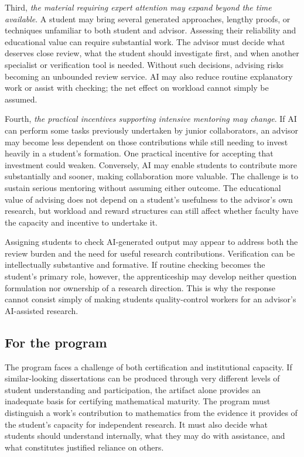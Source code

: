 \documentclass[11pt]{article}
\begin{document}
Third, \emph{the material requiring expert attention may expand beyond the time available}.
A student may bring several generated approaches, lengthy proofs, or techniques unfamiliar
to both student and advisor. Assessing their reliability and educational value can require
substantial work. The advisor must decide what deserves close review, what the student
should investigate first, and when another specialist or verification tool is needed.
Without such decisions, advising risks becoming an unbounded review service. AI may
also reduce routine explanatory work or assist with checking; the net effect on
workload cannot simply be assumed.

Fourth, \emph{the practical incentives supporting intensive mentoring may change}.
If AI can perform some tasks previously undertaken by junior collaborators, an advisor
may become less dependent on those contributions while still needing to invest heavily
in a student's formation. One practical incentive for accepting that investment could
weaken. Conversely, AI may enable students to contribute more substantially and sooner,
making collaboration more valuable. The challenge is to sustain serious mentoring
without assuming either outcome. The educational value of advising does not depend on
a student's usefulness to the advisor's own research, but workload and reward structures
can still affect whether faculty have the capacity and incentive to undertake it.

Assigning students to check AI-generated output may appear to address both the review burden
and the need for useful research contributions. Verification can be intellectually
substantive and formative. If routine checking becomes the student's primary role,
however, the apprenticeship may develop neither question formulation nor ownership of a
research direction. This is why the response cannot consist simply of making students
quality-control workers for an advisor's AI-assisted research.

\subsection{For the program}

The program faces a challenge of both certification and institutional capacity. If
similar-looking dissertations can be produced through very different levels of student
understanding and participation, the artifact alone provides an inadequate basis for
certifying mathematical maturity. The program must distinguish a work's contribution
to mathematics from the evidence it provides of the student's capacity for independent
research. It must also decide what students should understand internally, what they may
do with assistance, and what constitutes justified reliance on others.
\end{document}
